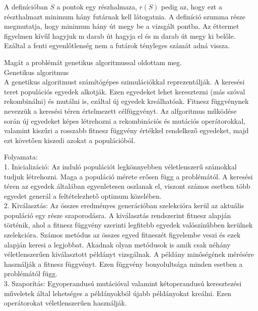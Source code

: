 A definícióban $S$ a pontok egy részhalmaza, $r(S)$ pedig az, hogy ezt a részthalmazt minimum hány futárnak kell látogatnia. A definíció szumma része megmutatja, hogy minimum hány út megy be a vizsgált pontba. Az éttermet figyelmen kívűl hagyjuk m darab út hagyja el és m darab út megy ki belőle. Ezáltal a fenti egyenlőtlenség nem a futárok tényleges számát adná vissza. 

Magát a problémát genetikus algoritmussal oldottam meg.\\

Genetikus algoritmus \\

A genetikus algoritmust számítógépes szimulációkkal reprezentálják. A keresési teret populációs egyedek alkotják. Ezen egyedeket lehet keresztezni (más szóval rekombinálni) és mutálni is, ezáltal új egyedek kreálhatóak. Fitnesz függvénynek nevezzük a keresési téren értelmezett célfüggvényt. Az alfgoritmus működése során új egyedeket képes létrehozni a rekombinációs és mutációs operátorokkal, valamint kiszűri a rosszabb fitnesz függvény értékkel rendelkező egyedeket, majd ezt követően kiszedi azokat a populációból.

Folyamata: \\

1. Inicializáció:  Az induló populációt legkönnyebben véletlenszerű számokkal tudjuk létrehozni. Maga a populáció mérete erősen függ a problémától. A keresési téren az egyedek általában egyenletesen oszlanak el, viszont számos esetben több egyedet generál a feltételezhető optimum közelében. \\

2. Kiválasztás: Az összes eredményes generációban szelekcióra kerül az aktuális populáció egy része szaporodásra. A kiválasztás rendszerint fitnesz alapján történik, ahol a fitnesz függvény szerinti legfitebb egyedek valószínűbben kerülnek szelekcióra. Számos metódus az összes egyed fitneszét figyelembe veszi és ezek alapján keresi a legjobbat. Akadnak olyan metódusok is amik csak néhány véletlenszerűen kiválasztott példányt vizsgálnak. A példány minőségének mérésére használják a fitnesz függvényt. Ezen függvény bonyolultsága minden esetben a problémától függ. \\

3. Szaporítás: Egyoperandusú mutációval valamint kétoperandusú keresztezési műveletek által lehetséges a példányokból újabb példányokat kreálni. Ezen operátorokat véletlenszerűen használják. \\

